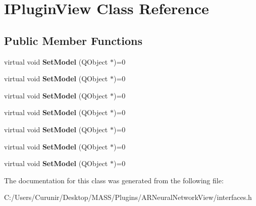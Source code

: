 \hypertarget{class_i_plugin_view}{}\section{I\+Plugin\+View Class Reference}
\label{class_i_plugin_view}
\subsection*{Public Member Functions}
\begin{DoxyCompactItemize}
\item 
\mbox{\label{class_i_plugin_view_a0da8ecfdc50ba7fb49c6db2dee6fbd81}} 
virtual void {\bfseries Set\+Model} (Q\+Object $\ast$)=0
\item 
\mbox{\label{class_i_plugin_view_a0da8ecfdc50ba7fb49c6db2dee6fbd81}} 
virtual void {\bfseries Set\+Model} (Q\+Object $\ast$)=0
\item 
\mbox{\label{class_i_plugin_view_a0da8ecfdc50ba7fb49c6db2dee6fbd81}} 
virtual void {\bfseries Set\+Model} (Q\+Object $\ast$)=0
\item 
\mbox{\label{class_i_plugin_view_a0da8ecfdc50ba7fb49c6db2dee6fbd81}} 
virtual void {\bfseries Set\+Model} (Q\+Object $\ast$)=0
\item 
\mbox{\label{class_i_plugin_view_a0da8ecfdc50ba7fb49c6db2dee6fbd81}} 
virtual void {\bfseries Set\+Model} (Q\+Object $\ast$)=0
\item 
\mbox{\label{class_i_plugin_view_a0da8ecfdc50ba7fb49c6db2dee6fbd81}} 
virtual void {\bfseries Set\+Model} (Q\+Object $\ast$)=0
\item 
\mbox{\label{class_i_plugin_view_a0da8ecfdc50ba7fb49c6db2dee6fbd81}} 
virtual void {\bfseries Set\+Model} (Q\+Object $\ast$)=0
\end{DoxyCompactItemize}


The documentation for this class was generated from the following file\+:\begin{DoxyCompactItemize}
\item 
C\+:/\+Users/\+Curunir/\+Desktop/\+M\+A\+S\+S/\+Plugins/\+A\+R\+Neural\+Network\+View/interfaces.\+h\end{DoxyCompactItemize}

